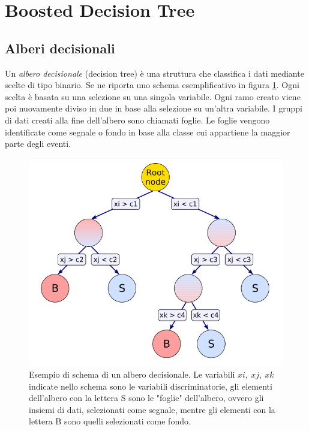\section{Boosted Decision Tree} \label{BDT}

    \subsection{Alberi decisionali}
    Un \textit{albero decisionale} (decision tree) è una struttura che classifica i dati mediante scelte di tipo binario. Se ne riporta uno schema esemplificativo in figura \ref{fig:BDT}. Ogni scelta è basata su una selezione su una singola variabile. %
    Ogni ramo creato viene poi nuovamente diviso in due in base alla selezione su un'altra variabile. I gruppi di dati creati alla fine dell'albero sono chiamati foglie. Le foglie vengono identificate come segnale o fondo in base alla classe cui appartiene la maggior parte degli eventi. 
    
    \begin{figure}[htbp]
        \centering
        \includegraphics[width=0.5\linewidth]{TMVA/BDT1.PNG}
        \caption{ Esempio di schema di un albero decisionale. Le variabili $xi, \ xj, \ xk$ indicate nello schema sono le variabili discriminatorie, gli elementi dell'albero con la lettera S sono le "foglie" dell'albero, ovvero gli insiemi di dati, selezionati come segnale, mentre gli elementi con la lettera B sono quelli selezionati come fondo.}
        \label{fig:BDT}
    \end{figure}
    
